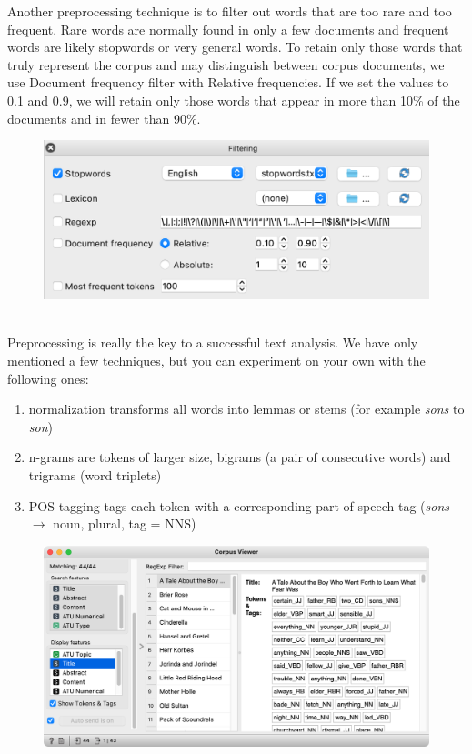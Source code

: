 Another preprocessing technique is to filter out words that are too rare and too frequent. Rare words are normally found in only a few documents and frequent words are likely stopwords or very general words. To retain only those words that truly represent the corpus and may distinguish between corpus documents, we use Document frequency filter with Relative frequencies. If we set the values to 0.1 and 0.9, we will retain only those words that appear in more than 10\% of the documents and in fewer than 90\%.

\newpage

\vspace{-0.2cm}
\begin{figure}[h]
  \centering
  \includegraphics[width=\linewidth]{filtering.png}%
  \caption{$\;$}
\end{figure}
\vspace{-0.1cm}

Preprocessing is really the key to a successful text analysis. We have only mentioned a few techniques, but you can experiment on your own with the following ones:
\begin{enumerate}
\item normalization transforms all words into lemmas or stems (for example \emph{sons} to \emph{son})
\item n-grams are tokens of larger size, bigrams (a pair of consecutive words) and trigrams (word triplets)
\item POS tagging tags each token with a corresponding part-of-speech tag (\emph{sons} $\rightarrow$ noun, plural, tag = NNS)
\end{enumerate}

\vspace{-0.2cm}
\begin{figure}[h]
  \centering
  \includegraphics[width=\linewidth]{corpus-viewer.png}%
  \caption{$\;$}
\end{figure}
\vspace{-0.3cm}

